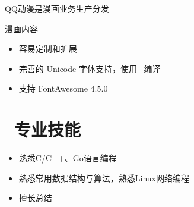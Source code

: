\documentclass{resume}
\begin{document}
{QQ动漫是漫画业务生产分发}
\begin{onehalfspacing}
漫画内容
\begin{itemize}
  \item 容易定制和扩展
  \item 完善的 Unicode 字体支持，使用 \XeLaTeX\ 编译
  \item 支持 FontAwesome 4.5.0
\end{itemize}
\end{onehalfspacing}


\section{\faCogs\ 专业技能}
\begin{itemize}[parsep=0.5ex]
  \item 熟悉C/C++、Go语言编程
  \item 熟悉常用数据结构与算法，熟悉Linux网络编程
  \item 擅长总结
\end{itemize}

%
%
\end{document}
